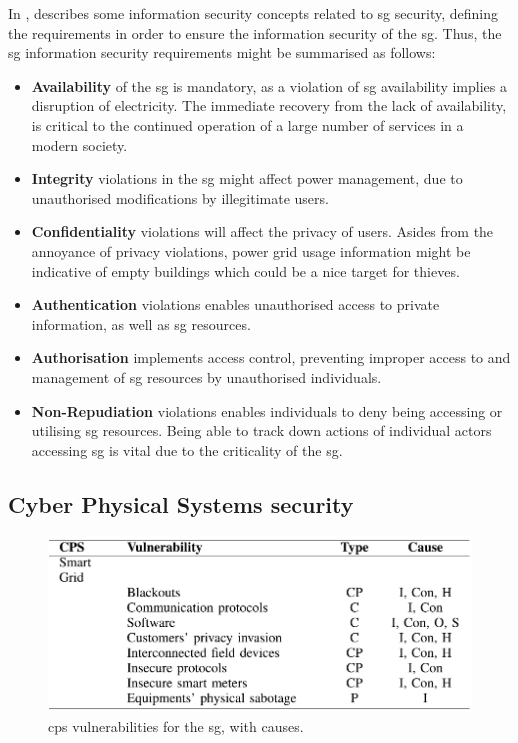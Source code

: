 In \cite{Shapsough2015}, \citeauthor{Shapsough2015}  describes some information security concepts related to \acrlong{sg} security, defining the requirements in order to ensure the information security of the \acrshort{sg}. Thus, the \acrlong{sg} information security requirements might be summarised as follows:

\begin{itemize}
    \item \textbf{Availability} of the \acrlong{sg} is mandatory, as a violation of \acrlong{sg} availability implies a disruption of electricity. The immediate recovery from the lack of availability, is critical to the continued operation of a large number of services in a modern society.  
    \item \textbf{Integrity} violations in the \acrshort{sg} might affect power management, due to unauthorised modifications by illegitimate users. 
    \item \textbf{Confidentiality} violations will affect the privacy of users. Asides from the annoyance of privacy violations, power grid usage information might be indicative of empty buildings which could be a nice target for thieves. \item \textbf{Authentication} violations enables unauthorised access to private information, as well as \acrfull{sg} resources.
    \item \textbf{Authorisation} implements access control, preventing improper access to and management of \acrshort{sg} resources by unauthorised individuals.      \item \textbf{Non-Repudiation} violations enables individuals to deny being accessing or utilising \acrshort{sg} resources. Being able to track down actions of individual actors accessing \acrshort{sg} is vital due to the criticality of the \acrshort{sg}.
\end{itemize}



\subsection{Cyber Physical Systems security}

\begin{figure}[ht]
\includegraphics[width=\linewidth]{figures/CP-Vulnerabilities-SG.png}
\caption[\acrlong{cps} vulnerabilities for the \acrlong{sg}]{\acrlong{cps} vulnerabilities for the \acrlong{sg}, with causes. \cite[p. 1809]{humayed2017cyber}}
\label{fig:CP-Vulnerabilities-SG.png}
\end{figure}

